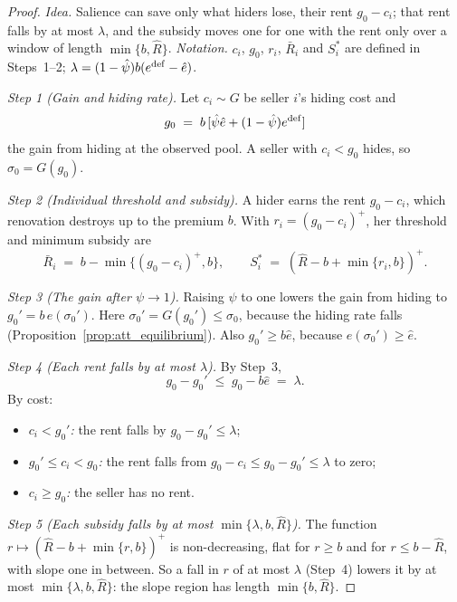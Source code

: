 \begin{proof}\upshape
\emph{Idea.} Salience can save only what hiders lose, their rent $g_0-c_i$; that rent falls by at most $\lambda$, and the subsidy moves one for one with the rent only over a window of length $\min\{b,\hat R\}$. \emph{Notation.} $c_i$, $g_0$, $r_i$, $\bar R_i$ and $S_i^*$ are defined in Steps~1--2; $\lambda=(1-\hat\psi)b(e^{\rm def}-\hat e)$.

\emph{Step 1 (Gain and hiding rate).} Let $c_i\sim G$ be seller $i$'s hiding cost and
\begin{equation*}
    g_0\;=\;b\,[\hat\psi\hat e+(1-\hat\psi)e^{\rm def}]
\end{equation*}
the gain from hiding at the observed pool. A seller with $c_i<g_0$ hides, so $\hat\sigma_0=G(g_0)$.

\emph{Step 2 (Individual threshold and subsidy).} A hider earns the rent $g_0-c_i$, which renovation destroys up to the premium $b$. With $r_i=(g_0-c_i)^+$, her threshold and minimum subsidy are
\begin{equation*}
    \bar R_i\;=\;b-\min\{(g_0-c_i)^+,b\},\qquad S_i^*\;=\;(\hat R-b+\min\{r_i,b\})^+.
\end{equation*}

\emph{Step 3 (The gain after $\psi\to1$).} Raising $\psi$ to one lowers the gain from hiding to $g_0'=b\,e(\sigma_0')$. Here $\sigma_0'=G(g_0')\le\hat\sigma_0$, because the hiding rate falls (Proposition~\ref{prop:att_equilibrium}). Also $g_0'\ge b\hat e$, because $e(\sigma_0')\ge\hat e$.

\emph{Step 4 (Each rent falls by at most $\lambda$).} By Step~3,
\begin{equation*}
    g_0-g_0'\;\le\;g_0-b\hat e\;=\;\lambda.
\end{equation*}
By cost:
\begin{itemize}
    \item \emph{$c_i<g_0'$:} the rent falls by $g_0-g_0'\le\lambda$;
    \item \emph{$g_0'\le c_i<g_0$:} the rent falls from $g_0-c_i\le g_0-g_0'\le\lambda$ to zero;
    \item \emph{$c_i\ge g_0$:} the seller has no rent.
\end{itemize}

\emph{Step 5 (Each subsidy falls by at most $\min\{\lambda,b,\hat R\}$).} The function $r\mapsto(\hat R-b+\min\{r,b\})^+$ is non-decreasing, flat for $r\ge b$ and for $r\le b-\hat R$, with slope one in between. So a fall in $r$ of at most $\lambda$ (Step~4) lowers it by at most $\min\{\lambda,b,\hat R\}$: the slope region has length $\min\{b,\hat R\}$.


\end{proof}
